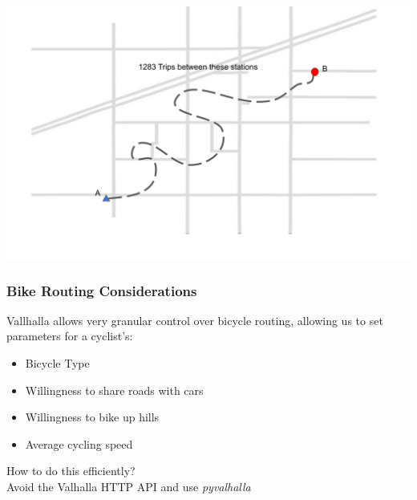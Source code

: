 \documentclass{beamer}
\begin{document}
\begin{frame}
    \includegraphics[width=\textwidth,page=3]{graphics_document.pdf}
\end{frame}
\begin{frame}
    \frametitle{Bike Routing Considerations}
    Vallhalla allows very granular control over bicycle routing, allowing us to set parameters for a cyclist's:
    \begin{itemize}
        \item Bicycle Type\pause
        \item Willingness to share roads with cars\pause
        \item Willingness to bike up hills\pause
        \item Average cycling speed\pause
    \end{itemize} \pause
    How to do this efficiently?\pause 
    \\
    Avoid the Valhalla HTTP API and use \emph{pyvalhalla} 
\end{frame}
\end{document}
